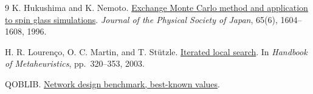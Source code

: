 \documentclass[a4paper]{article}
\begin{document}



\begin{thebibliography}{9}
K. Hukushima and K. Nemoto.
\href{https://doi.org/10.1143/JPSJ.65.1604}{Exchange Monte Carlo method and application to spin glass simulations}.
\emph{Journal of the Physical Society of Japan}, 65(6), 1604--1608, 1996.

H. R. Lourenço, O. C. Martin, and T. Stützle.
\href{https://arxiv.org/abs/math/0102188}{Iterated local search}.
In \emph{Handbook of Metaheuristics}, pp.~320--353, 2003.

QOBLIB.
\href{https://github.com/ZIB-AOPT/QOBLIB/blob/main/08-network/solutions/README.md}{Network design benchmark, best-known values}.
\end{thebibliography}
\end{document}
